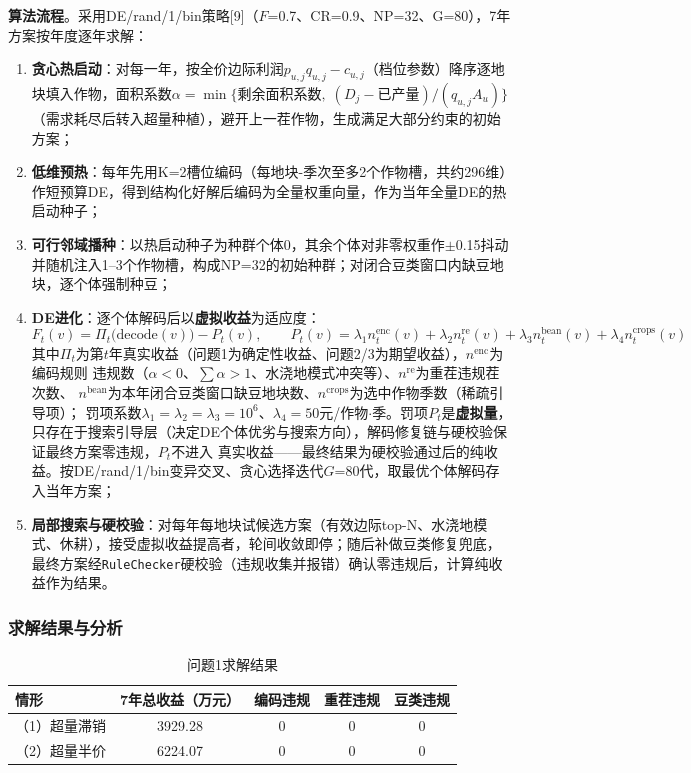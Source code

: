 \documentclass[12pt,a4paper]{article}
\begin{document}
\noindent\textbf{算法流程}。采用DE/rand/1/bin策略[9]（$F$=0.7、CR=0.9、NP=32、G=80），7年方案按年度逐年求解：
\begin{enumerate}
  \item \textbf{贪心热启动}：对每一年，按全价边际利润$p_{u,j}q_{u,j}-c_{u,j}$（档位参数）降序逐地块填入作物，面积系数$\alpha=\min\big\{\text{剩余面积系数},\;(D_j-\text{已产量})/(q_{u,j}A_u)\big\}$（需求耗尽后转入超量种植），避开上一茬作物，生成满足大部分约束的初始方案；
  \item \textbf{低维预热}：每年先用K=2槽位编码（每地块-季次至多2个作物槽，共约296维）作短预算DE，得到结构化好解后编码为全量权重向量，作为当年全量DE的热启动种子；
  \item \textbf{可行邻域播种}：以热启动种子为种群个体0，其余个体对非零权重作$\pm$0.15抖动并随机注入1--3个作物槽，构成NP=32的初始种群；对闭合豆类窗口内缺豆地块，逐个体强制种豆；
  \item \textbf{DE进化}：逐个体解码后以\textbf{虚拟收益}为适应度：
\begin{equation}
F_t(v)=\Pi_t\big(\mathrm{decode}(v)\big)-P_t(v),\qquad
P_t(v)=\lambda_1 n^{\mathrm{enc}}_t(v)+\lambda_2 n^{\mathrm{re}}_t(v)+\lambda_3 n^{\mathrm{bean}}_t(v)+\lambda_4 n^{\mathrm{crops}}_t(v)
\label{eq:vfit}
\end{equation}
其中$\Pi_t$为第$t$年真实收益（问题1为确定性收益、问题2/3为期望收益），$n^{\mathrm{enc}}$为编码规则
违规数（$\alpha<0$、$\sum\alpha>1$、水浇地模式冲突等）、$n^{\mathrm{re}}$为重茬违规茬次数、
$n^{\mathrm{bean}}$为本年闭合豆类窗口缺豆地块数、$n^{\mathrm{crops}}$为选中作物季数（稀疏引导项）；
罚项系数$\lambda_1=\lambda_2=\lambda_3=10^6$、$\lambda_4=50$元/作物$\cdot$季。罚项$P_t$是\textbf{虚拟量}，
只存在于搜索引导层（决定DE个体优劣与搜索方向），解码修复链与硬校验保证最终方案零违规，$P_t$不进入
真实收益——最终结果为硬校验通过后的纯收益。按DE/rand/1/bin变异交叉、贪心选择迭代$G$=80代，取最优个体解码存入当年方案；
  \item \textbf{局部搜索与硬校验}：对每年每地块试候选方案（有效边际top-N、水浇地模式、休耕），接受虚拟收益提高者，轮间收敛即停；随后补做豆类修复兜底，最终方案经\texttt{RuleChecker}硬校验（违规收集并报错）确认零违规后，计算纯收益作为结果。
\end{enumerate}

\subsubsection{求解结果与分析}

\begin{table}[H]
\centering
\caption{问题1求解结果}
\label{tab:q1}
\begin{tabular}{lcccc}
\toprule
情形 & 7年总收益（万元） & 编码违规 & 重茬违规 & 豆类违规 \\
\midrule
（1）超量滞销 & 3929.28 & 0 & 0 & 0 \\
（2）超量半价 & 6224.07 & 0 & 0 & 0 \\
\bottomrule
\end{tabular}
\end{table}
\end{document}

